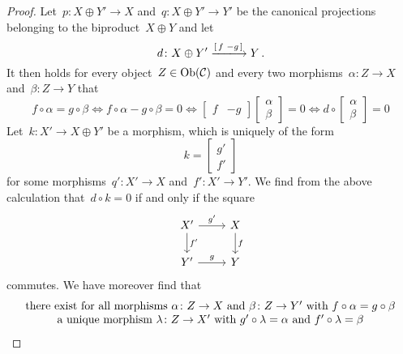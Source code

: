 \begin{proof}
  Let~$p \colon X \oplus Y' \to X$ and~$q \colon X \oplus Y' \to Y'$ be the canonical projections belonging to the biproduct~$X \oplus Y$ and let
  \[
      d
    \colon
      X \oplus Y'
    \xlongto{\begin{bsmallmatrix} f & -g \end{bsmallmatrix}}
      Y \,.
  \]
  It then holds for every object~$Z \in \operatorname{Ob}(\mathcal{C})$ and every two morphisms~$\alpha \colon Z \to X$ and~$\beta \colon Z \to Y$ that
  \[
          f \circ \alpha = g \circ \beta
    \iff  f \circ \alpha - g \circ \beta = 0
    \iff  \begin{bmatrix}
            f & -g
          \end{bmatrix}
          \begin{bmatrix}
            \alpha  \\
            \beta
          \end{bmatrix}
          = 0
    \iff  d
          \circ
          \begin{bmatrix}
            \alpha  \\
            \beta
          \end{bmatrix}
          = 0
  \]
  Let~$k \colon X' \to X \oplus Y'$ be a morphism, which is uniquely of the form
  \[
      k
    = \begin{bmatrix}
        g'  \\
        f'
      \end{bmatrix}
  \]
  for some morphisms~$q' \colon X' \to X$ and~$f' \colon X' \to Y'$.
  We find from the above calculation that~$d \circ k = 0$ if and only if the square
  \[
    \begin{tikzcd}
        X'
        \arrow{r}[above]{g'}
        \arrow{d}[right]{f'}
      & X
        \arrow{d}[right]{f}
      \\
        Y'
        \arrow{r}[above]{g}
      & Y
    \end{tikzcd}
  \]
  commutes.
  We have moreover find that
  \begin{align*}
        {}& \begin{tabular}{c}
              there exist for all morphisms
              $\alpha \colon Z \to X$ and~$\beta \colon Z \to Y'$ with~$f \circ \alpha = g \circ \beta$ \\
              a unique morphism~$\lambda \colon Z \to X'$ with~$g' \circ \lambda = \alpha$ and~$f' \circ \lambda = \beta$
            \end{tabular} \\

\end{align*}
\end{proof}
